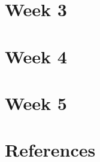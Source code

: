 \documentclass[
  letterpaper,
  DIV=11,
  numbers=noendperiod]{scrreprt}
\begin{document}

\hypertarget{week-3}{%
\chapter{Week 3}\label{week-3}}


\hypertarget{week-4}{%
\chapter{Week 4}\label{week-4}}


\hypertarget{week-5}{%
\chapter{Week 5}\label{week-5}}


\hypertarget{references-3}{%
\chapter*{References}\label{references-3}}
\end{document}
